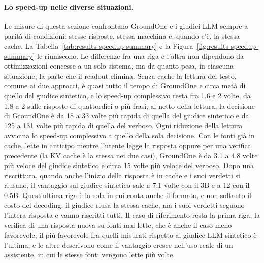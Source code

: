 \paragraph{Lo speed-up nelle diverse situazioni.} Le misure di questa sezione confrontano GroundOne e i giudici LLM
sempre a parità di condizioni: stesse risposte, stessa macchina e, quando c'è, la stessa cache. La
Tabella~\ref{tab:results-speedup-summary} e la Figura~\ref{fig:results-speedup-summary} le riuniscono. Le differenze fra una riga e l'altra non dipendono da
ottimizzazioni concesse a un solo sistema, ma da quanto pesa, in ciascuna situazione, la parte che il readout elimina.
Senza cache la lettura del testo, comune ai due approcci, è quasi tutto il tempo di GroundOne e circa metà di quello del
giudice sintetico, e lo speed-up complessivo resta fra 1.6 e 2 volte, da 1.8 a 2 sulle risposte di quattordici o più frasi; al netto della lettura, la decisione di GroundOne è
da 18 a 33 volte più rapida di quella del giudice sintetico e da 125 a 131 volte più rapida di quella del verboso. Ogni
riduzione della lettura avvicina lo speed-up complessivo a quello della sola decisione. Con le fonti già in cache, lette
in anticipo mentre l'utente legge la risposta oppure per una verifica precedente (la KV cache è la stessa nei due casi),
GroundOne è da 3.1 a 4.8 volte più veloce del giudice sintetico e circa 15 volte più veloce del verboso. Dopo una
riscrittura, quando anche l'inizio della risposta è in cache e i suoi verdetti si riusano, il vantaggio sul giudice
sintetico sale a 7.1 volte con il 3B e a 12 con il 0.5B. Quest'ultima riga è la sola in cui conta anche il formato, e non
soltanto il costo del decoding: il giudice riusa la stessa cache, ma i suoi verdetti seguono l'intera risposta e vanno
riscritti tutti. Il caso di riferimento resta la prima riga, la verifica di una risposta nuova su fonti mai lette, che è anche il caso meno favorevole; il più favorevole fra quelli misurati rispetto al giudice LLM sintetico è l'ultima, e le altre descrivono come il vantaggio cresce nell'uso reale di un assistente, in cui le stesse fonti vengono lette più volte.

